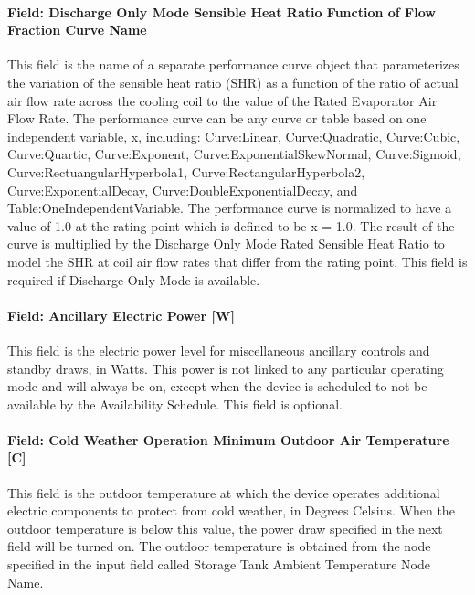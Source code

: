 \paragraph{Field: Discharge Only Mode Sensible Heat Ratio Function of Flow Fraction Curve Name}\label{field-discharge-only-mode-sensible-heat-ratio-function-of-flow-fraction-curve-name}

This field is the name of a separate performance curve object that parameterizes the variation of the sensible heat ratio (SHR) as a function of the ratio of actual air flow rate across the cooling coil to the value of the Rated Evaporator Air Flow Rate. The performance curve can be any curve or table based on one independent variable, x, including: Curve:Linear, Curve:Quadratic, Curve:Cubic, Curve:Quartic, Curve:Exponent, Curve:ExponentialSkewNormal, Curve:Sigmoid, Curve:RectuangularHyperbola1, Curve:RectangularHyperbola2, Curve:ExponentialDecay, Curve:DoubleExponentialDecay, and Table:OneIndependentVariable. The performance curve is normalized to have a value of 1.0 at the rating point which is defined to be x = 1.0. The result of the curve is multiplied by the Discharge Only Mode Rated Sensible Heat Ratio to model the SHR at coil air flow rates that differ from the rating point. This field is required if Discharge Only Mode is available.

\paragraph{Field: Ancillary Electric Power {[}W{]}}\label{field-ancillary-electric-power-w}

This field is the electric power level for miscellaneous ancillary controls and standby draws, in Watts. This power is not linked to any particular operating mode and will always be on, except when the device is scheduled to not be available by the Availability Schedule. This field is optional.

\paragraph{Field: Cold Weather Operation Minimum Outdoor Air Temperature {[}C{]}}\label{field-cold-weather-operation-minimum-outdoor-air-temperature-c}

This field is the outdoor temperature at which the device operates additional electric components to protect from cold weather, in Degrees Celsius. When the outdoor temperature is below this value, the power draw specified in the next field will be turned on. The outdoor temperature is obtained from the node specified in the input field called Storage Tank Ambient Temperature Node Name.

